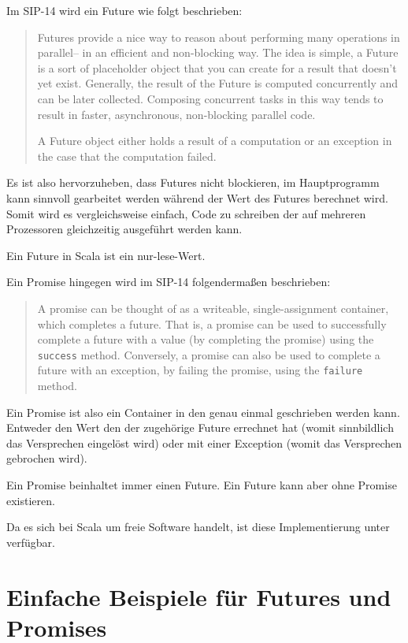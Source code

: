 \documentclass[11pt,a4paper,titlepage,ngerman]{scrartcl}
\begin{document}
Im SIP-14 wird ein Future wie folgt beschrieben:
\begin{quote}
Futures provide a nice way to reason about performing many operations in 
parallel– in an efficient and non-blocking way. The idea is simple, a Future 
is a sort of placeholder object that you can create for a result that doesn’t 
yet exist. Generally, the result of the Future is computed concurrently and can 
be later collected. Composing concurrent tasks in this way tends to result in 
faster, asynchronous, non-blocking parallel code.

A Future object either holds a result of a computation or an 
exception in the case that the computation failed.
\end{quote}

Es ist also hervorzuheben, dass Futures nicht blockieren, im Hauptprogramm
kann sinnvoll gearbeitet werden während der Wert des Futures berechnet wird.
Somit wird es vergleichsweise einfach, Code zu schreiben der auf mehreren
Prozessoren gleichzeitig ausgeführt werden kann.

Ein Future in Scala ist ein nur-lese-Wert.

Ein Promise hingegen wird im SIP-14 folgendermaßen beschrieben:
\begin{quote}
A promise can be thought of as a writeable, single-assignment container, which 
completes a future. That is, a promise can be used to successfully complete a 
future with a value (by \glqq completing\grqq{} the promise) using the \texttt{success} method. 
Conversely, a promise can also be used to complete a future with an exception, 
by failing the promise, using the \texttt{failure} method.
\end{quote}

Ein Promise ist also ein \glqq Container\grqq{} in den genau einmal geschrieben
werden kann. Entweder den Wert den der zugehörige Future errechnet hat
(womit sinnbildlich das Versprechen eingelöst wird) oder mit einer Exception
(womit das Versprechen gebrochen wird).

Ein Promise beinhaltet immer einen Future. Ein Future kann aber ohne Promise
existieren.

Da es sich bei Scala um freie Software handelt, ist diese Implementierung
unter \cite{scalaConcurrentCode} verfügbar.

\section{Einfache Beispiele für Futures und Promises}
\end{document}
